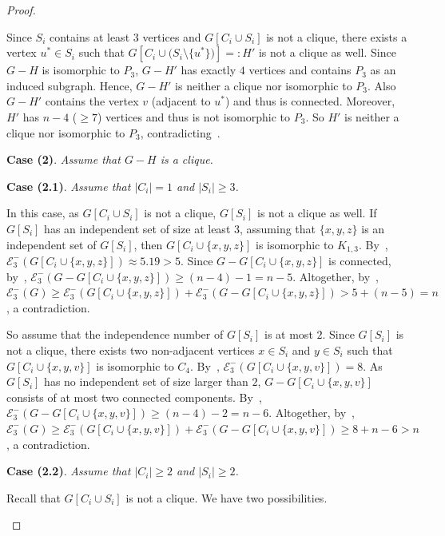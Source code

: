 \documentclass[a4paper,12pt]{article}
\theoremstyle{plain}
\newenvironment{proof*}{\noindent \emph{Proof of the claim.}}{\hfill$\Diamond$}
\begin{document}
\begin{proof}
\begin{proof*}
Since $S_i$ contains at least $3$ vertices and $G[C_i\cup S_i]$ is not a clique, there exists a vertex $u^*\in S_i$ such that $G[C_i\cup \big(S_i\setminus \{u^*\}\big)]=:H'$ is not a clique as well. Since $G-H$ is isomorphic to $P_3$, $G-H'$ has exactly $4$ vertices and contains $P_3$ as an induced subgraph. Hence, $G-H'$ is neither a clique nor isomorphic to $P_3$.
Also $G-H'$ contains the vertex $v$ (adjacent to $u^*$) and thus is connected. Moreover, $H'$ has $n-4$ ($\geq 7$) vertices and thus is not isomorphic to $P_3$. So $H'$ is neither a clique nor isomorphic to $P_3$, contradicting~.


\smallskip
\noindent
\textbf{Case (2)}. \emph{Assume that $G-H$ is a clique.} 
\smallskip


\noindent
\textbf{Case (2.1)}. \emph{Assume that $|C_i|=1$ and $|S_i|\geq 3$.} 
\smallskip

In this case, as $G[C_i\cup S_i]$ is not a clique, $G[S_i]$ is not a clique as well. If $G[S_i]$ has an independent set of size at least $3$, assuming that $\{x,y,z\}$ is an independent set of $G[S_i]$, then $G[C_i\cup\{x,y,z\}]$ is isomorphic to $K_{1,3}$. By~, $\mathcal{E}_3^{-}(G[C_i\cup\{x,y,z\}])\approx 5.19 > 5$. Since $G-G[C_i\cup\{x,y,z\}]$ is connected, by~, $\mathcal{E}_3^{-}(G-G[C_i\cup\{x,y,z\}])\geq (n-4)-1=n-5$. Altogether, by~, $\mathcal{E}_3^{-}(G)\geq\mathcal{E}_3^{-}(G[C_i\cup\{x,y,z\}])+\mathcal{E}_3^{-}(G-G[C_i\cup\{x,y,z\}])>5+(n-5)=n$, a contradiction.  

So assume that the independence number of $G[S_i]$ is at most $2$. Since $G[S_i]$ is not a clique, there exists two non-adjacent vertices $x\in S_i$ and $y\in S_i$ such that $G[C_i\cup \{x,y,v\}]$ is isomorphic to $C_4$. By~, $\mathcal{E}_3^{-}(G[C_i\cup \{x,y,v\}])=8$. As $G[S_i]$ has no independent set of size larger than $2$, $G-G[C_i\cup \{x,y,v\}]$ consists of at most two connected components. By~, $\mathcal{E}_3^{-}(G-G[C_i\cup \{x,y,v\}])\geq (n-4)-2=n-6$. Altogether, by~, $\mathcal{E}_3^{-}(G)\geq\mathcal{E}_3^{-}(G[C_i\cup \{x,y,v\}])+\mathcal{E}_3^{-}(G-G[C_i\cup \{x,y,v\}])\geq 8+n-6>n$, a contradiction. 


\smallskip
\noindent
\textbf{Case (2.2)}. \emph{Assume that $|C_i|\geq 2$ and $|S_i|\geq 2$.} 
\smallskip

Recall that $G[C_i\cup S_i]$ is not a clique. We have two possibilities.


\end{proof*}
\end{proof}
\end{document}
